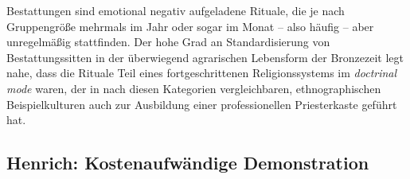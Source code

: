 \documentclass[openany,twoside,twocolumn]{book}
\begin{document}
Bestattungen sind emotional negativ aufgeladene Rituale, die je nach Gruppengröße mehrmals im Jahr oder sogar im Monat -- also häufig -- aber unregelmäßig stattfinden. Der hohe Grad an Standardisierung von Bestattungssitten in der überwiegend agrarischen Lebensform der Bronzezeit legt nahe, dass die Rituale Teil eines fortgeschrittenen Religionssystems im \emph{doctrinal mode} waren, der in nach diesen Kategorien vergleichbaren, ethnographischen Beispielkulturen auch zur Ausbildung einer professionellen Priesterkaste geführt hat.

\hypertarget{henrich-kostenaufwandige-demonstration}{%
\subsection{Henrich: Kostenaufwändige Demonstration}\label{henrich-kostenaufwandige-demonstration}}
\end{document}
